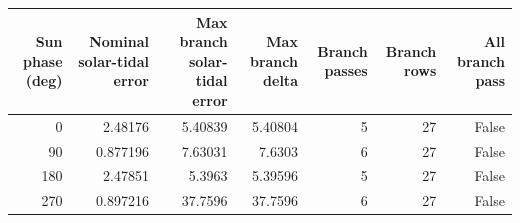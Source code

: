 \begin{tabular}{rrrrrrr}
\toprule
Sun phase (deg) & Nominal solar-tidal error & Max branch solar-tidal error & Max branch delta & Branch passes & Branch rows & All branch pass \\
\midrule
0 & 2.48176 & 5.40839 & 5.40804 & 5 & 27 & False \\
90 & 0.877196 & 7.63031 & 7.6303 & 6 & 27 & False \\
180 & 2.47851 & 5.3963 & 5.39596 & 5 & 27 & False \\
270 & 0.897216 & 37.7596 & 37.7596 & 6 & 27 & False \\
\bottomrule
\end{tabular}
